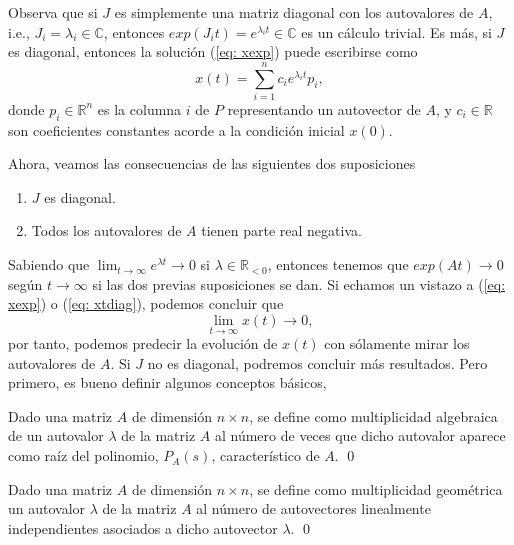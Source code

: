 Observa que si $J$ es simplemente una matriz diagonal con los autovalores de $A$, i.e., $J_i = \lambda_i \in \mathbb{C}$, entonces $exp(J_it) = e^{\lambda_it} \in\mathbb{C}$ es un cálculo trivial. Es más, si $J$ es diagonal, entonces la solución (\ref{eq: xexp}) puede escribirse como
\begin{equation}
	x(t) = \sum_{i=1}^nc_i e^{\lambda_i t}p_i,
	\label{eq: xtdiag}
\end{equation}
donde $p_i\in\mathbb{R}^n$ es la columna $i$ de $P$ representando un autovector de $A$, y $c_i\in\mathbb{R}$ son coeficientes constantes acorde a la condición inicial $x(0)$.

Ahora, veamos las consecuencias de las siguientes dos suposiciones
\begin{enumerate}
	\item $J$ es diagonal.
	\item Todos los autovalores de $A$ tienen parte real negativa.
\end{enumerate}

Sabiendo que $\lim_{t\to\infty} e^{\lambda t} \to 0$ si $\lambda \in \mathbb{R}_{<0}$, entonces tenemos que $exp(At) \to 0$ según $t\to\infty$ si las dos previas suposiciones se dan. Si echamos un vistazo a (\ref{eq: xexp}) o (\ref{eq: xtdiag}), podemos concluir que 
\begin{equation}
	\lim_{t\to\infty} x(t) \to 0,
	\label{eq: xlim}
\end{equation}
por tanto, podemos predecir la evolución de $x(t)$ con sólamente mirar los autovalores de $A$. Si $J$ no es diagonal, podremos concluir más resultados. Pero primero, es bueno definir algunos conceptos básicos,

\begin{definition}
Dado una matriz $A$ de dimensión $n\times n$, se define como multiplicidad algebraica de un autovalor $\lambda$ de la matriz $A$ al número de veces que dicho autovalor aparece como raíz del polinomio, $P_A(s)$, característico de $A$. 
\qed
\end{definition}

\begin{definition}
Dado una matriz $A$ de dimensión $n\times n$, se define como multiplicidad geométrica un autovalor $\lambda$ de la matriz $A$ al número de autovectores  linealmente independientes asociados a dicho autovector $\lambda$. 
\qed
\end{definition}

